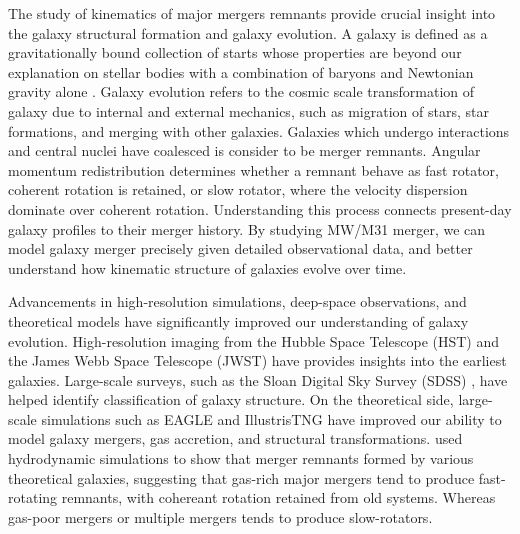 \documentclass[twocolumn, trackchanges]{aastex7}
\begin{document}


The study of kinematics of major mergers remnants provide crucial insight into the galaxy structural formation and galaxy evolution. A galaxy is defined as a gravitationally bound collection of starts whose properties are beyond our explanation on stellar bodies with a combination of baryons and Newtonian gravity alone \citep{GALAXYDefined2012AJ....144...76W}. Galaxy evolution refers to the cosmic scale transformation of galaxy due to internal and external mechanics, such as migration of stars, star formations, and merging with other galaxies. Galaxies which undergo interactions and central nuclei have coalesced is consider to be merger remnants. Angular momentum redistribution determines whether a remnant behave as fast rotator, coherent rotation is retained, or slow rotator, where the velocity dispersion dominate over coherent rotation.  Understanding this process connects present-day galaxy profiles to their merger history. By studying MW/M31 merger, we can model galaxy merger precisely given detailed observational data, and better understand how kinematic structure of galaxies evolve over time. 


Advancements in high-resolution simulations, deep-space observations, and theoretical models have significantly improved our understanding of galaxy evolution. High-resolution imaging from the Hubble Space Telescope (HST) \citep{HST2004PASP..116..790M} and the James Webb Space Telescope (JWST) \citep{JWST2006SSRv..123..485G} have provides insights into the earliest galaxies. Large-scale surveys, such as the Sloan Digital Sky Survey (SDSS) \citep{SDSS2019BAAS...51g.274K}, have helped identify classification of galaxy structure. On the theoretical side, large-scale simulations such as EAGLE \citep{EAGLE2015MNRAS.446..521S} and IllustrisTNG \citep{IllustrisTNGnelson2021illustristngsimulationspublicdata} have improved our ability to model galaxy mergers, gas accretion, and structural transformations. \cite{Cox_2006, Naab} used hydrodynamic simulations to show that merger remnants formed by various theoretical galaxies, suggesting that gas-rich major mergers tend to produce fast-rotating remnants, with cohereant rotation retained from old systems. Whereas gas-poor mergers or multiple mergers tends to produce slow-rotators. 
\end{document}
